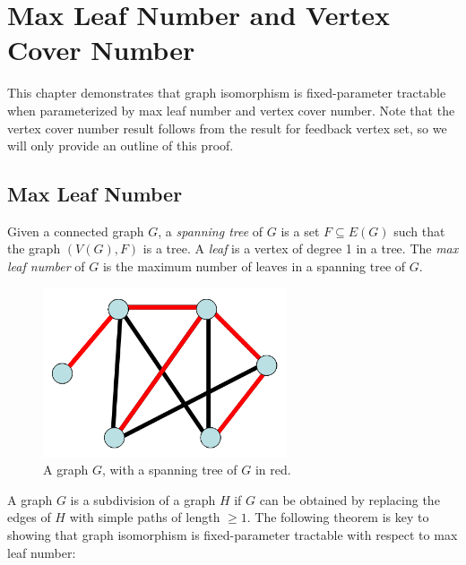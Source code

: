 \documentclass[11pt]{report}
\begin{document}
\chapter{Max Leaf Number and Vertex Cover Number}

This chapter demonstrates that graph isomorphism is fixed-parameter tractable when parameterized by max leaf number and vertex cover number. Note that the vertex cover number result follows from the result for feedback vertex set, so we will only provide an outline of this proof.



\section{Max Leaf Number}

Given a connected graph $G$, a \emph{spanning tree} of $G$ is a set $F \subseteq E(G)$ such that the graph $(V(G), F)$ is a tree. A \emph{leaf } is a vertex of degree 1 in a tree. The \emph{max leaf number} of $G$ is the maximum number of leaves in a spanning tree of $G$.


\begin{figure}[h]
\begin{center}
\leavevmode
\includegraphics[height=50mm]{spanning_tree_v0.png}
\end{center}
\caption{A graph $G$, with a spanning tree of $G$ in red.}
\label{fig:spanning_tree}
\end{figure}


A graph $G$ is a subdivision of a graph $H$  if $G$ can be obtained by replacing the edges of $H$ with simple paths of length $\geq 1$. The following theorem is key to showing that graph isomorphism is fixed-parameter tractable with respect to max leaf number:
\end{document}
